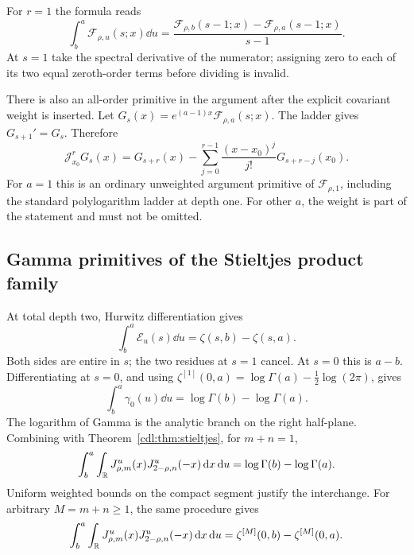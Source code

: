 \documentclass[11pt,letterpaper]{article}
\numberwithin{equation}{section}
\theoremstyle{definition}\newtheorem{definition}[theorem]{Definition}
\theoremstyle{remark}\newtheorem{remark}[theorem]{Remark}
\newcommand{\F}{\mathcal F}\newcommand{\E}{\mathcal E}
\begin{document}
For $r=1$ the formula reads
\begin{equation}\label{cdl:eq:firstaprimitive}
 \int_b^a\F_{\rho,u}(s;x)\dd u
 =\frac{\F_{\rho,b}(s-1;x)-\F_{\rho,a}(s-1;x)}{s-1}.
\end{equation}
At $s=1$ take the spectral derivative of the numerator; assigning zero
to each of its two equal zeroth-order terms before dividing is invalid.

There is also an all-order primitive in the argument after the explicit
covariant weight is inserted. Let
$G_s(x)=e^{(a-1)x}\F_{\rho,a}(s;x)$. The ladder gives
$G_{s+1}'=G_s$. Therefore
\begin{equation}\label{cdl:eq:xprimitive}
 \mathcal J_{x_0}^r G_s(x)=G_{s+r}(x)
 -\sum_{j=0}^{r-1}\frac{(x-x_0)^j}{j!}G_{s+r-j}(x_0).
\end{equation}
For $a=1$ this is an ordinary unweighted argument primitive of
$\F_{\rho,1}$, including the standard polylogarithm ladder at depth one.
For other $a$, the weight is part of the statement and must not be omitted.

\subsection{Gamma primitives of the Stieltjes product family}
At total depth two, Hurwitz differentiation gives
\begin{equation}\label{cdl:eq:Eprimitive}
 \int_b^a\E_u(s)\dd u=\zeta(s,b)-\zeta(s,a).
\end{equation}
Both sides are entire in $s$; the two residues at $s=1$ cancel.
At $s=0$ this is $a-b$. Differentiating at $s=0$, and using
$\zeta^{[1]}(0,a)=\log\Gamma(a)-\tfrac12\log(2\pi)$, gives
\begin{equation}\label{cdl:eq:gammaprimitive}
 \int_b^a\gamma_0(u)\dd u=\log\Gamma(b)-\log\Gamma(a).
\end{equation}
The logarithm of Gamma is the analytic branch on the right half-plane.
Combining with Theorem~\ref{cdl:thm:stieltjes}, for $m+n=1$,
\begin{equation}\label{cdl:eq:tripleprimitive}
 \int_b^a\int_\mathbb R J_{\rho,m}^u(x)J_{2-\rho,n}^u(-x)\,\mathrm d x\,\mathrm d u
 =\log\Gamma(b)-\log\Gamma(a).
\end{equation}
Uniform weighted bounds on the compact segment justify the interchange.
For arbitrary $M=m+n\ge1$, the same procedure gives
\begin{equation}\label{cdl:eq:allprimitivejets}
 \int_b^a\int_\mathbb R J_{\rho,m}^u(x)J_{2-\rho,n}^u(-x)\,\mathrm d x\,\mathrm d u
 =\zeta^{[M]}(0,b)-\zeta^{[M]}(0,a).
\end{equation}
\end{document}
